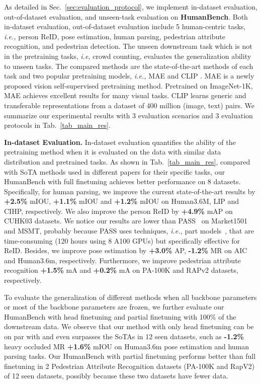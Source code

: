 \documentclass[10pt,twocolumn,letterpaper]{article}
\begin{document}
 
As detailed in Sec.~\ref{sec:evaluation_protocol}, we implement in-dataset evaluation, out-of-dataset evaluation, and unseen-task evaluation on \textbf{HumanBench}. Both in-dataset evaluation, out-of-dataset evaluation include 5 human-centric tasks, \emph{i.e.,} person ReID, pose estimation, human parsing, pedestrian attribute recognition, and pedestrian detection. 
The unseen downstream task which is not in the pretraining tasks, \emph{i.e,} crowd counting, evaluates the generalization ability to unseen tasks. The compared methods are the state-of-the-art methods of each task and two popular pretraining models, \emph{i.e.,} MAE \cite{he2022masked} and CLIP \cite{radford2021learning}. 
MAE is a newly proposed vision self-supervised pretraining method. Pretrained on ImageNet-1K, MAE achieves excellent results for many visual tasks. CLIP learns generic and transferable representations from a dataset of 400 million (image, text) pairs. 
We summarize our experimental results with 3 evaluation scenarios and 3 evaluation protocols in Tab.~\ref{tab_main_res}.

\noindent \textbf{In-dataset Evaluation.} \label{sec:seen}
In-dataset evaluation quantifies the ability of the pretraining method when it is evaluated on the data with similar data distribution and pretrained tasks. As shown in Tab.~\ref{tab_main_res}, compared with SoTA methods used in different papers for their specific tasks, our HumanBench with full finetuning achieves better performance on 8 datasets. Specifically, for human parsing, we improve the current state-of-the-art results by \textbf{+2.5\%} mIOU, \textbf{+1.1\%} mIOU and \textbf{+1.2\%} mIOU on Human3.6M, LIP and CIHP, respectively. We also improve the person ReID by \textbf{+4.9\%} mAP on CUHK03 datasets. We notice our results are lower than PASS~\cite{zhu2022pass} on Market1501 and MSMT, probably because PASS uses techniques, \emph{i.e.,} part models~\cite{wang2018learning,sun2018beyond}, that are time-consuming (120 hours using 8 A100 GPUs) but specifically effective for ReID. Besides, we improve pose estimation by \textbf{+3.0\%} AP, \textbf{-1.2\%} MR on AIC and Human3.6m, respectively. Furthermore, we improve pedestrian attribute recognition \textbf{+1.5\%} mA and \textbf{+0.2\%} mA on PA-100K and RAPv2 datasets, respectively.  












To evaluate the generalization of different methods when all backbone parameters or most of the backbone parameters are frozen, we further evaluate our HumanBench with head finetuning and partial finetuning with 100\% of the downstream data. We observe that our method with only head finetuning can be on par with and even surpasses the SoTAs in 12 seen datasets, such as \textbf{-1.2\%} heavy occluded MR \textbf{+1.6\%} mIOU on Human3.6m pose estimation and human parsing tasks. Our HumanBench with partial finetuning performs better than full finetuning in 2 Pedestrian Attribute Recognition datasets (PA-100K and RapV2) of 12 seen datasets, possibly because these two datasets have fewer data. 
\end{document}
